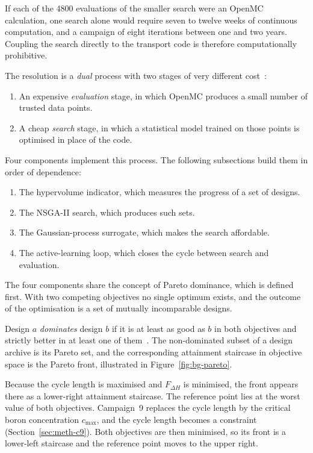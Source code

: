 If each of the 4800 evaluations of the smaller search were an OpenMC
calculation, one search
alone would require seven to twelve weeks of continuous computation, and
a campaign of eight iterations between one and two years. Coupling the
search directly to the transport code is therefore computationally
prohibitive.

The resolution is a \emph{dual} process with two stages of very
different cost~\cite{forrester_book_2008}:

\begin{enumerate}
  \item An expensive \emph{evaluation} stage, in which OpenMC produces
        a small number of trusted data points.

  \item A cheap \emph{search} stage, in which a statistical model
        trained on those points is optimised in place of the code.
\end{enumerate}

Four components implement this process. The following subsections build
them in order of dependence:

\begin{enumerate}
  \item The hypervolume indicator, which measures the progress of a set
        of designs.

  \item The NSGA-II search, which produces such sets.

  \item The Gaussian-process surrogate, which makes the search
        affordable.

  \item The active-learning loop, which closes the cycle between search
        and evaluation.
\end{enumerate}

The four components share the concept of Pareto dominance, which is
defined first. With two competing objectives no single optimum exists, and the outcome of the
optimisation is a set of mutually incomparable designs.

Design $a$ \emph{dominates} design $b$ if it is at least as good as $b$
in both objectives and strictly better in at least one of
them~\cite{miettinen_1999,deb_2001}. The non-dominated subset of a design archive is its Pareto set, and the
corresponding attainment staircase in objective space is the Pareto
front, illustrated in Figure~\ref{fig:bg-pareto}.

Because the cycle length is maximised and $F_{\Delta H}$ is minimised,
the front appears there as a lower-right attainment staircase. The
reference point lies at the worst value of both objectives. Campaign~9
replaces the cycle length by the critical boron concentration
$c_\mathrm{max}$, and the cycle length becomes a constraint
(Section~\ref{sec:meth-c9}). Both objectives are then minimised, so
its front is a lower-left staircase and the reference point moves to
the upper right.

